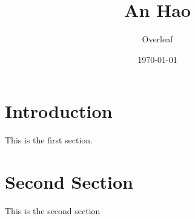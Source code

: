 \documentclass{article}
\title{An Hao}
\author{Overleaf}
\date{\today}
\begin{document}
\maketitle
\section{Introduction}

This is the first section.

\blindtext

\section{Second Section}
This is the second section

\blindtext
\end{document}
